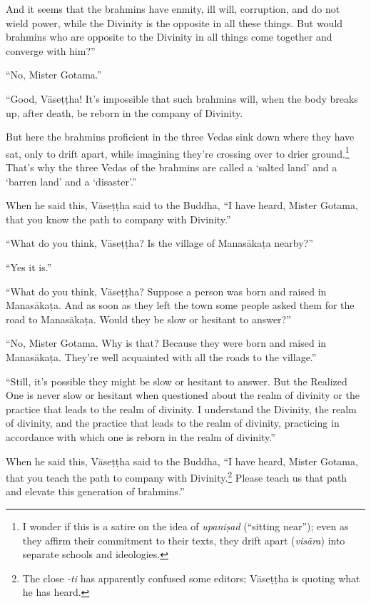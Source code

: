 \documentclass[12pt,openany]{book}%
\begin{document}
And it seems that the brahmins have enmity, ill will, corruption, and do not wield power, while the Divinity is the opposite in all these things. But would brahmins who are opposite to the Divinity in all things come together and converge with him?” 

“No, Mister Gotama.” 

“Good, \textsanskrit{Vāseṭṭha}! It’s impossible that such brahmins will, when the body breaks up, after death, be reborn in the company of Divinity. 

But here the brahmins proficient in the three Vedas sink down where they have sat, only to drift apart, while imagining they’re crossing over to drier ground.\footnote{I wonder if this is a satire on the idea of \textit{\textsanskrit{upaniṣad}} (“sitting near”); even as they affirm their commitment to their texts, they drift apart (\textit{\textsanskrit{visāra}}) into separate schools and ideologies. } That’s why the three Vedas of the brahmins are called a ‘salted land’ and a ‘barren land’ and a ‘disaster’.” 

When he said this, \textsanskrit{Vāseṭṭha} said to the Buddha, “I have heard, Mister Gotama, that you know the path to company with Divinity.” 

“What do you think, \textsanskrit{Vāseṭṭha}? Is the village of \textsanskrit{Manasākaṭa} nearby?” 

“Yes it is.” 

“What do you think, \textsanskrit{Vāseṭṭha}? Suppose a person was born and raised in \textsanskrit{Manasākaṭa}. And as soon as they left the town some people asked them for the road to \textsanskrit{Manasākaṭa}. Would they be slow or hesitant to answer?” 

“No, Mister Gotama. Why is that? Because they were born and raised in \textsanskrit{Manasākaṭa}. They’re well acquainted with all the roads to the village.” 

“Still, it’s possible they might be slow or hesitant to answer. But the Realized One is never slow or hesitant when questioned about the realm of divinity or the practice that leads to the realm of divinity. I understand the Divinity, the realm of divinity, and the practice that leads to the realm of divinity, practicing in accordance with which one is reborn in the realm of divinity.” 

When he said this, \textsanskrit{Vāseṭṭha} said to the Buddha, “I have heard, Mister Gotama, that you teach the path to company with Divinity.\footnote{The close \textit{-ti} has apparently confused some editors; \textsanskrit{Vāseṭṭha} is quoting what he has heard. } Please teach us that path and elevate this generation of brahmins.” 
\end{document}

